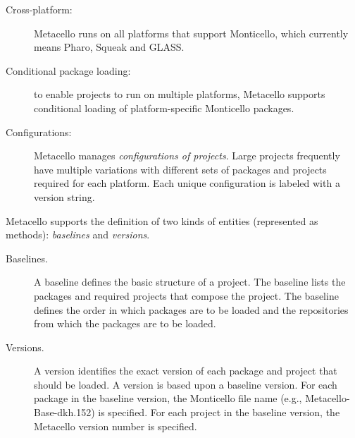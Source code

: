 \documentclass[a4paper,10pt,twoside]{book}
\begin{document}
\begin{description}
\item[Cross-platform:] Metacello  runs on all platforms that support Monticello, which currently means Pharo, Squeak and GLASS.

\item[Conditional package loading:] to enable projects to run on multiple platforms, Metacello supports conditional loading of platform-specific Monticello packages. 

\item[Configurations:] Metacello manages \emph{configurations of projects}.  Large projects frequently have multiple variations with different sets of packages and projects required for each platform.  Each unique configuration is labeled with a version string.

  

\end{description}



Metacello supports the definition of two kinds of entities (represented as methods): \emph{baselines} and \emph{versions}.

\begin{description}
\item[Baselines.] A baseline defines the basic structure of a project. The baseline lists the packages and required projects that compose the project. The baseline defines the order in which packages are to be loaded and the repositories from which the packages are to be loaded.

\item[Versions.] A version identifies the exact version of each package and project that should be loaded. A version is based upon a baseline version. For each package in the baseline version, the Monticello file name (e.g., Metacello-Base-dkh.152) is specified. For each project in the baseline version, the Metacello version number is specified. 

\end{description}
\end{document}
